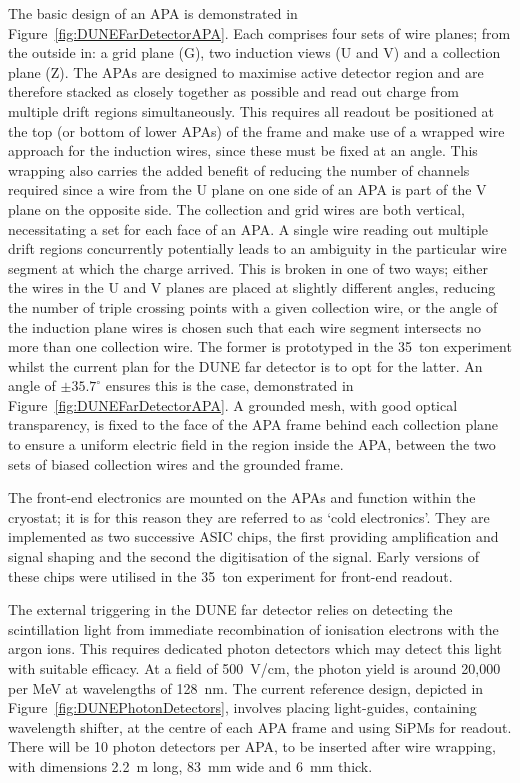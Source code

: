 The basic design of an APA is demonstrated in Figure~\ref{fig:DUNEFarDetectorAPA}.  Each comprises four sets of wire planes; from the outside in: a grid plane (G), two induction views (U and V) and a collection plane (Z).  The APAs are designed to maximise active detector region and are therefore stacked as closely together as possible and read out charge from multiple drift regions simultaneously.  This requires all readout be positioned at the top (or bottom of lower APAs) of the frame and make use of a wrapped wire approach for the induction wires, since these must be fixed at an angle.  This wrapping also carries the added benefit of reducing the number of channels required since a wire from the U plane on one side of an APA is part of the V plane on the opposite side.  The collection and grid wires are both vertical, necessitating a set for each face of an APA.  A single wire reading out multiple drift regions concurrently potentially leads to an ambiguity in the particular wire segment at which the charge arrived.  This is broken in one of two ways; either the wires in the U and V planes are placed at slightly different angles, reducing the number of triple crossing points with a given collection wire, or the angle of the induction plane wires is chosen such that each wire segment intersects no more than one collection wire.  The former is prototyped in the 35~ton experiment whilst the current plan for the DUNE far detector is to opt for the latter.  An angle of $\pm35.7^{\circ}$ ensures this is the case, demonstrated in Figure~\ref{fig:DUNEFarDetectorAPA}.  A grounded mesh, with good optical transparency, is fixed to the face of the APA frame behind each collection plane to ensure a uniform electric field in the region inside the APA, between the two sets of biased collection wires and the grounded frame.

The front-end electronics are mounted on the APAs and function within the cryostat; it is for this reason they are referred to as `cold electronics'.  They are implemented as two successive ASIC chips, the first providing amplification and signal shaping and the second the digitisation of the signal.  Early versions of these chips were utilised in the 35~ton experiment for front-end readout.

The external triggering in the DUNE far detector relies on detecting the scintillation light from immediate recombination of ionisation electrons with the argon ions.  This requires dedicated photon detectors which may detect this light with suitable efficacy.  At a field of 500~V/cm, the photon yield is around 20,000 per MeV at wavelengths of 128~nm.  The current reference design, depicted in Figure~\ref{fig:DUNEPhotonDetectors}, involves placing light-guides, containing wavelength shifter, at the centre of each APA frame and using SiPMs for readout.  There will be 10 photon detectors per APA, to be inserted after wire wrapping, with dimensions 2.2~m long, 83~mm wide and 6~mm thick.

